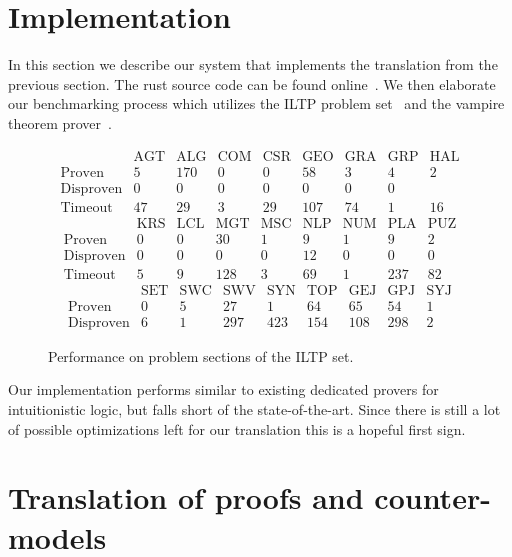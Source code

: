 \documentclass[a4paper,11pt]{report}
\theoremstyle{definition}
\theoremstyle{definition}
\theoremstyle{definition}
\theoremstyle{definition}
\theoremstyle{definition}
\theoremstyle{definition}
\theoremstyle{definition}
\begin{document}
	\section{Implementation}
	
	In this section we describe our system that implements the translation from the previous section. The rust source code can be found online~\cite{implementation}. We then elaborate our benchmarking process which utilizes the ILTP problem set~\cite{iltp} and the vampire theorem prover~\cite{Kov_cs_2013}.
	
		
	\begin{figure}[h]\label{results}
		$$\begin{matrix}
			&\text{AGT}&\text{ALG}&\text{COM}&\text{CSR}&\text{GEO}&\text{GRA}&\text{GRP}&\text{HAL}\\
			\text{Proven}&5&170&0&0&58&3&4&2\\
			\text{Disproven}&0&0&0&0&0&0&0&\\
			\text{Timeout}&47&29&3&29&107&74&1&16
		\end{matrix}$$
		$$\begin{matrix}
			&\text{KRS}&\text{LCL}&\text{MGT}&\text{MSC}&\text{NLP}&\text{NUM}&\text{PLA}&\text{PUZ}\\
			\text{Proven}&0&0&30&1&9&1&9&2\\
			\text{Disproven}&0&0&0&0&12&0&0&0\\
			\text{Timeout}&5&9&128&3&69&1&237&82
		\end{matrix}$$
		$$\begin{matrix}
			&\text{SET}&\text{SWC}&\text{SWV}&\text{SYN}&\text{TOP}&\text{GEJ}&\text{GPJ}&\text{SYJ}\\
			\text{Proven}&0&5&27&1&64&65&54&1\\
			\text{Disproven}&6&1&297&423&154&108&298&2
		\end{matrix}$$
		\caption{Performance on problem sections of the ILTP set.}
	\end{figure}
	
	Our implementation performs similar to existing dedicated provers for intuitionistic logic, but falls short of the state-of-the-art. Since there is still a lot of possible optimizations left for our translation this is a hopeful first sign.
	
	\section{Translation of proofs and counter-models}
	
\end{document}
